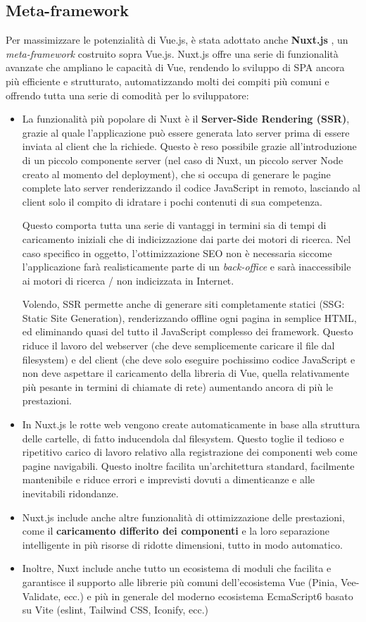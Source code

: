 \subsection{Meta-framework}
Per massimizzare le potenzialità di Vue.js, è stata adottato anche \textbf{Nuxt.js} \cite{nuxt}, un \emph{meta-framework} costruito sopra Vue.js. Nuxt.js offre una serie di funzionalità avanzate che ampliano le capacità di Vue, rendendo lo sviluppo di SPA ancora più efficiente e strutturato, automatizzando molti dei compiti più comuni e offrendo tutta una serie di comodità per lo sviluppatore:
\begin{itemize}
    \item La funzionalità più popolare di Nuxt è il \textbf{Server-Side Rendering (SSR)}, grazie al quale l'applicazione può essere generata lato server prima di essere inviata al client che la richiede. Questo è reso possibile grazie all'introduzione di un piccolo componente server (nel caso di Nuxt, un piccolo server Node creato al momento del deployment), che si occupa di generare le pagine complete lato server renderizzando il codice JavaScript in remoto, lasciando al client solo il compito di idratare i pochi contenuti di sua competenza.
    
    Questo comporta tutta una serie di vantaggi in termini sia di tempi di caricamento iniziali che di indicizzazione dai parte dei motori di ricerca. Nel caso specifico in oggetto, l'ottimizzazione SEO non è necessaria siccome l'applicazione farà realisticamente parte di un \emph{back-office} e sarà inaccessibile ai motori di ricerca / non indicizzata in Internet.

    Volendo, SSR permette anche di generare siti completamente statici (SSG: Static Site Generation), renderizzando offline ogni pagina in semplice HTML, ed eliminando quasi del tutto il JavaScript complesso dei framework. Questo riduce il lavoro del webserver (che deve semplicemente caricare il file dal filesystem) e del client (che deve solo eseguire pochissimo codice JavaScript e non deve aspettare il caricamento della libreria di Vue, quella relativamente più pesante in termini di chiamate di rete) aumentando ancora di più le prestazioni.
    \item In Nuxt.js le rotte web vengono create automaticamente in base alla struttura delle cartelle, di fatto inducendola dal filesystem. Questo toglie il tedioso e ripetitivo carico di lavoro relativo alla registrazione dei componenti web come pagine navigabili. Questo inoltre facilita un'architettura standard, facilmente mantenibile e riduce errori e imprevisti dovuti a dimenticanze e alle inevitabili ridondanze.
    \item Nuxt.js include anche altre funzionalità di ottimizzazione delle prestazioni, come il \textbf{caricamento differito dei componenti} e la loro separazione intelligente in più risorse di ridotte dimensioni, tutto in modo automatico.
    \item Inoltre, Nuxt include anche tutto un ecosistema di moduli che facilita e garantisce il supporto alle librerie più comuni dell'ecosistema Vue (Pinia, Vee-Validate, ecc.) e più in generale del moderno ecosistema EcmaScript6 basato su Vite (eslint, Tailwind CSS, Iconify, ecc.)
\end{itemize}

